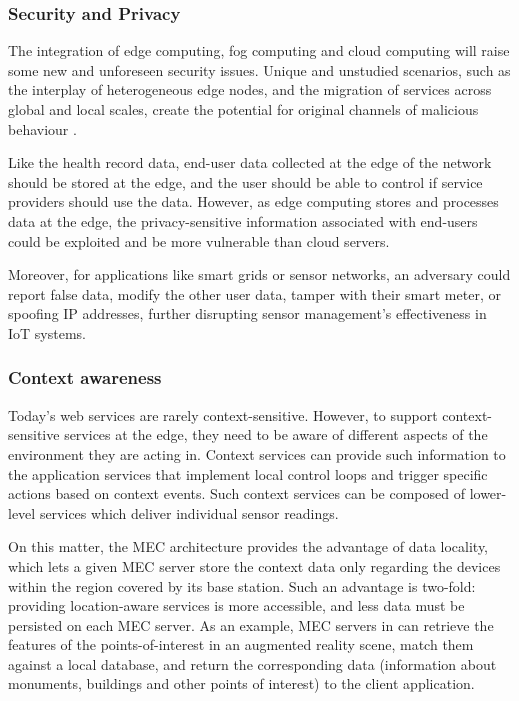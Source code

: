 \documentclass{ieeeaccess}
\begin{document}
\subsubsection{Security and Privacy}

The integration of edge computing, fog computing and cloud computing will raise some new and unforeseen security issues. Unique and unstudied scenarios, such as the interplay of heterogeneous edge nodes, and the migration of services across global and local scales, create the potential for original channels of malicious behaviour \cite{edge-computing-survey}.

Like the health record data, end-user data collected at the edge of the network should be stored at the edge, and the user should be able to control if service providers should use the data. However, as edge computing stores and processes data at the edge, the privacy-sensitive information associated with end-users could be exploited and be more vulnerable than cloud servers.

Moreover, for applications like smart grids or sensor networks, an adversary could report false data, modify the other user data, tamper with their smart meter, or spoofing IP addresses, further disrupting sensor management's effectiveness in IoT systems.

\subsubsection{Context awareness}

Today's web services are rarely context-sensitive. However, to support context-sensitive services at the edge, they need to be aware of different aspects of the environment they are acting in. Context services can provide such information to the application services that implement local control loops and trigger specific actions based on context events. Such context services can be composed of lower-level services which deliver individual sensor readings.

On this matter, the MEC architecture provides the advantage of data locality, which lets a given MEC server store the context data only regarding the devices within the region covered by its base station. Such an advantage is two-fold: providing location-aware services is more accessible, and less data must be persisted on each MEC server. As an example, MEC servers in \cite{mobile-augmented-reality} can retrieve the features of the points-of-interest in an augmented reality scene, match them against a local database, and return the corresponding data (information about monuments, buildings and other points of interest) to the client application.
\end{document}

